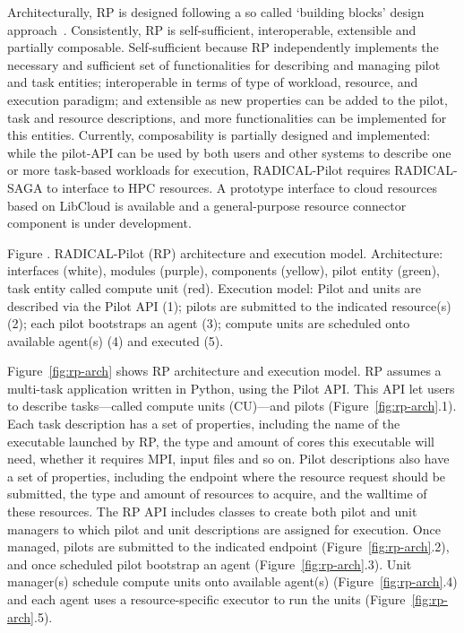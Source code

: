\documentclass{webofc}
\begin{document}
	Architecturally, RP is designed following a so called ‘building blocks’ design approach~\cite{bb}. Consistently, RP is self-sufficient, interoperable, extensible and partially composable. Self-sufficient because RP independently implements the necessary and sufficient set of functionalities for describing and managing pilot and task entities; interoperable in terms of type of workload, resource, and execution paradigm; and extensible as new properties can be added to the pilot, task and resource descriptions, and more functionalities can be implemented for this entities. Currently, composability is partially designed and implemented: while the pilot-API can be used by both users and other systems to describe one or more task-based workloads for execution, RADICAL-Pilot requires RADICAL-SAGA to interface to HPC resources. A prototype interface to cloud resources based on LibCloud is available and a general-purpose resource connector component is under development.
	
	
	Figure \number. RADICAL-Pilot (RP) architecture and execution model. Architecture: interfaces (white), modules (purple), components (yellow), pilot entity (green), task entity called compute unit (red). Execution model: Pilot and units are described via the Pilot API (1); pilots are submitted to the indicated resource(s) (2); each pilot bootstraps an agent (3); compute units are scheduled onto available agent(s) (4) and executed (5).
	
	Figure~\ref{fig:rp-arch} shows RP architecture and execution model. RP assumes a multi-task application written in Python, using the Pilot API. This API let users to describe tasks---called compute units (CU)---and pilots (Figure~\ref{fig:rp-arch}.1). Each task description has a set of properties, including the name of the executable launched by RP, the type and amount of cores this executable will need, whether it requires MPI, input files and so on. Pilot descriptions also have a set of properties, including the endpoint where the resource request should be submitted, the type and amount of resources to acquire, and the walltime of these resources. The RP API includes classes to create both pilot and unit managers to which pilot and unit descriptions are assigned for execution. Once managed, pilots are submitted to the indicated endpoint (Figure~\ref{fig:rp-arch}.2), and once scheduled pilot bootstrap an agent (Figure~\ref{fig:rp-arch}.3). Unit manager(s) schedule compute units onto available agent(s) (Figure~\ref{fig:rp-arch}.4) and each agent uses a resource-specific executor to run the units (Figure~\ref{fig:rp-arch}.5). 
	
\end{document}
